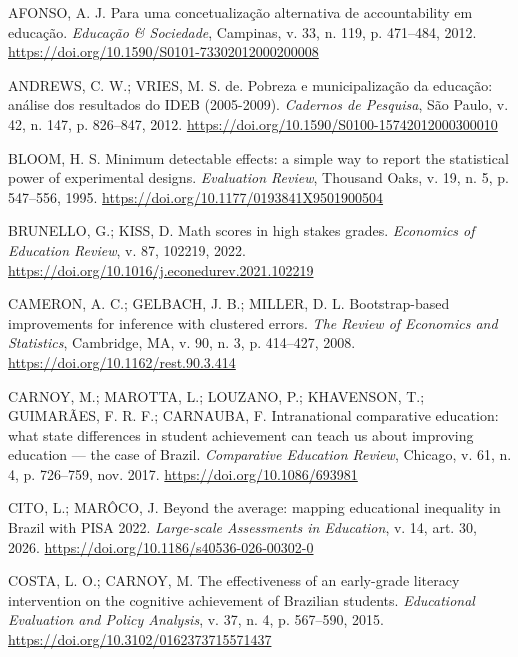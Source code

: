 \documentclass[12pt,a4paper]{article}
\begin{document}
{\sloppy
\noindent AFONSO, A. J. Para uma concetualização alternativa de accountability em educação. \textit{Educação \& Sociedade}, Campinas, v. 33, n. 119, p. 471--484, 2012. \href{https://doi.org/10.1590/S0101-73302012000200008}{https://doi.org/10.1590/S0101-73302012000200008}

\noindent ANDREWS, C. W.; VRIES, M. S. de. Pobreza e municipalização da educação: análise dos resultados do IDEB (2005-2009). \textit{Cadernos de Pesquisa}, São Paulo, v. 42, n. 147, p. 826--847, 2012. \href{https://doi.org/10.1590/S0100-15742012000300010}{https://doi.org/10.1590/S0100-15742012000300010}

\noindent BLOOM, H. S. Minimum detectable effects: a simple way to report the statistical power of experimental designs. \textit{Evaluation Review}, Thousand Oaks, v. 19, n. 5, p. 547--556, 1995. \href{https://doi.org/10.1177/0193841X9501900504}{https://doi.org/10.1177/0193841X9501900504}

\noindent BRUNELLO, G.; KISS, D. Math scores in high stakes grades. \textit{Economics of Education Review}, v. 87, 102219, 2022. \href{https://doi.org/10.1016/j.econedurev.2021.102219}{https://doi.org/10.1016/j.econedurev.2021.102219}

\noindent CAMERON, A. C.; GELBACH, J. B.; MILLER, D. L. Bootstrap-based improvements for inference with clustered errors. \textit{The Review of Economics and Statistics}, Cambridge, MA, v. 90, n. 3, p. 414--427, 2008. \href{https://doi.org/10.1162/rest.90.3.414}{https://doi.org/10.1162/rest.90.3.414}

\noindent CARNOY, M.; MAROTTA, L.; LOUZANO, P.; KHAVENSON, T.; GUIMARÃES, F. R. F.; CARNAUBA, F. Intranational comparative education: what state differences in student achievement can teach us about improving education --- the case of Brazil. \textit{Comparative Education Review}, Chicago, v. 61, n. 4, p. 726--759, nov. 2017. \href{https://doi.org/10.1086/693981}{https://doi.org/10.1086/693981}

\noindent CITO, L.; MARÔCO, J. Beyond the average: mapping educational inequality in Brazil with PISA 2022. \textit{Large-scale Assessments in Education}, v. 14, art. 30, 2026. \href{https://doi.org/10.1186/s40536-026-00302-0}{https://doi.org/10.1186/s40536-026-00302-0}

\noindent COSTA, L. O.; CARNOY, M. The effectiveness of an early-grade literacy intervention on the cognitive achievement of Brazilian students. \textit{Educational Evaluation and Policy Analysis}, v. 37, n. 4, p. 567--590, 2015. \href{https://doi.org/10.3102/0162373715571437}{https://doi.org/10.3102/0162373715571437}

}
\end{document}
